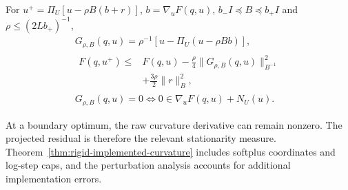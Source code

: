 \begin{proposition}
For $u^+=\Pi_U[u-\rho B(b+r)]$, $b=\nabla_uF(q,u)$,
$b_-I\preceq B\preceq b_+I$ and $\rho\le(2Lb_+)^{-1}$,
\begin{gather}
 G_{\rho,B}(q,u)=\rho^{-1}[u-\Pi_U(u-\rho Bb)],\\
 \begin{aligned}
 F(q,u^+)\le {}&F(q,u)-\tfrac\rho4\|G_{\rho,B}(q,u)\|_{B^{-1}}^2\\
 &+\tfrac{3\rho}{2}\|r\|_B^2,
 \end{aligned}\\
 G_{\rho,B}(q,u)=0\Longleftrightarrow0\in\nabla_uF(q,u)+N_U(u).
\end{gather}
\end{proposition}
At a boundary optimum, the raw curvature derivative can remain nonzero. The projected residual is therefore the relevant stationarity measure. Theorem~\ref{thm:rigid-implemented-curvature} includes softplus coordinates and log-step caps, and the perturbation analysis accounts for additional implementation errors.

